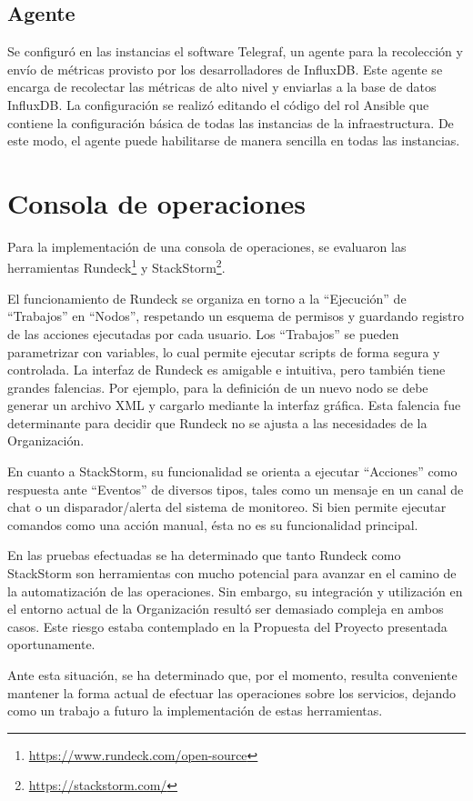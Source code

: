 
\subsection{Agente}

Se configuró en las instancias el software Telegraf, un agente para la
recolección y envío de métricas provisto por los desarrolladores de
InfluxDB. Este agente se encarga de recolectar las métricas de alto
nivel y enviarlas a la base de datos InfluxDB. La configuración se
realizó editando el código del rol Ansible que contiene la
configuración básica de todas las instancias de la infraestructura. De
este modo, el agente puede habilitarse de manera sencilla en todas las
instancias.

\section{Consola de operaciones}

Para la implementación de una consola de operaciones, se evaluaron las
herramientas Rundeck\footnote{
  \href{https://www.rundeck.com/open-source}{https://www.rundeck.com/open-source}
} y StackStorm\footnote{
  \href{https://stackstorm.com/}{https://stackstorm.com/} }.

El funcionamiento de Rundeck se organiza en torno a la ``Ejecución'' de
``Trabajos'' en ``Nodos'', respetando un esquema de permisos y guardando
registro de las acciones ejecutadas por cada usuario. Los ``Trabajos''
se pueden parametrizar con variables, lo cual permite ejecutar scripts
de forma segura y controlada. La interfaz de Rundeck es amigable e
intuitiva, pero también tiene grandes falencias. Por ejemplo, para la
definición de un nuevo nodo se debe generar un archivo XML y cargarlo
mediante la interfaz gráfica. Esta falencia fue determinante para
decidir que Rundeck no se ajusta a las necesidades de la Organización.

En cuanto a StackStorm, su funcionalidad se orienta a ejecutar
``Acciones'' como respuesta ante ``Eventos'' de diversos tipos, tales como
un mensaje en un canal de chat o un disparador/alerta del sistema de
monitoreo. Si bien permite ejecutar comandos como una acción manual,
ésta no es su funcionalidad principal.

En las pruebas efectuadas se ha determinado que tanto Rundeck como
StackStorm son herramientas con mucho potencial para avanzar en el
camino de la automatización de las operaciones. Sin embargo, su
integración y utilización en el entorno actual de la Organización
resultó ser demasiado compleja en ambos casos. Este riesgo estaba
contemplado en la Propuesta del Proyecto presentada oportunamente.

Ante esta situación, se ha determinado que, por el momento, resulta
conveniente mantener la forma actual de efectuar las operaciones sobre
los servicios, dejando como un trabajo a futuro la implementación de
estas herramientas.
